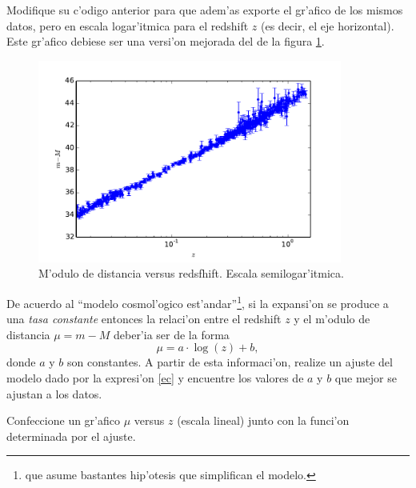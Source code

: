 \documentclass[11pt]{exam}
\begin{document}
\begin{parts}
\item Modifique su c'odigo anterior para que adem'as exporte el gr'afico de los mismos datos, pero en escala logar'itmica para el redshift $z$ (es decir, el eje horizontal). Este gr'afico debiese ser una versi'on mejorada del de la figura \ref{4}.
\begin{figure}[ht]
\centerline{\includegraphics[width=10cm]{figs/m-M_vs_z_semilog.pdf}}
 \caption{M'odulo de distancia versus redsfhift. Escala semilogar'itmica.}
\label{4}
\end{figure}
\item De acuerdo al ``modelo cosmol'ogico est'andar''\footnote{que asume bastantes hip'otesis que simplifican el modelo.}, si la expansi'on se produce a una \textit{tasa constante} entonces la relaci'on entre el redshift $z$ y el m'odulo de distancia $\mu = m-M$ deber'ia ser de la forma
\begin{equation}\label{ec}
\mu=a\cdot \log(z)+b,
\end{equation}
donde $a$ y $b$ son constantes. A partir de esta informaci'on, realize un ajuste del modelo dado por la expresi'on \eqref{ec} y encuentre los valores de $a$ y $b$ que mejor se ajustan a los datos.
\item Confeccione un gr'afico $\mu$ versus $z$ (escala lineal) junto con la funci'on determinada por el ajuste.
\end{parts}
\end{document}
